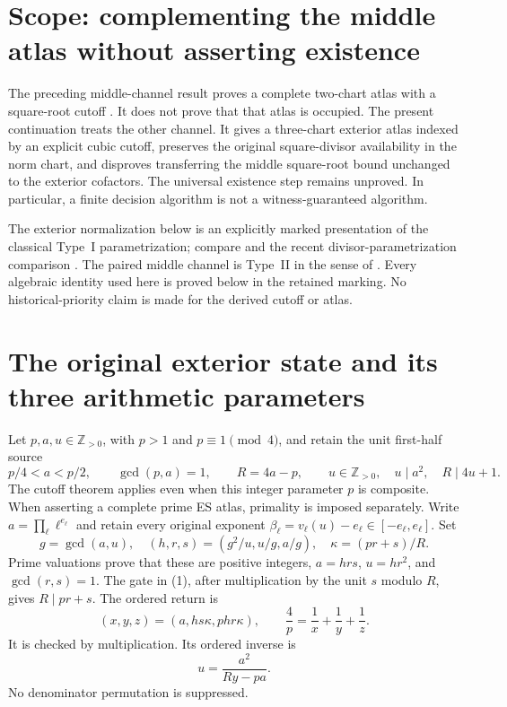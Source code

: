 \section{Scope: complementing the middle atlas without asserting existence}
The preceding middle-channel result proves a complete two-chart atlas with a
square-root cutoff \cite{Middle}. It does not prove that that atlas is occupied.
The present continuation treats the other channel. It gives a three-chart
exterior atlas indexed by an explicit cubic cutoff, preserves the original
square-divisor availability in the norm chart, and disproves transferring the
middle square-root bound unchanged to the exterior cofactors. The universal
existence step remains unproved. In particular, a finite decision algorithm is
not a witness-guaranteed algorithm.

The exterior normalization below is an explicitly marked presentation of the
classical Type~I parametrization; compare \cite[\S2, Proposition~2.2]{ET} and
the recent divisor-parametrization comparison \cite[\S3]{BHF}.  The paired
middle channel is Type~II in the sense of \cite[\S2,
Proposition~2.6]{ET}.  Every algebraic identity used here is proved below in
the retained marking.  No historical-priority claim is made for the derived
cutoff or atlas.

\section{The original exterior state and its three arithmetic parameters}
Let $p,a,u\in\mathbb Z_{>0}$, with $p>1$ and $p\equiv1\pmod4$, and retain
the unit first-half source
\[
 p/4<a<p/2,\qquad \gcd(p,a)=1,\qquad R=4a-p,
 \qquad u\in\mathbb Z_{>0},\quad u\mid a^2,\quad R\mid4u+1. \tag{1}
\]
The cutoff theorem applies even when this integer parameter $p$ is composite.
When asserting a complete prime ES atlas, primality is imposed separately.
Write $a=\prod_\ell\ell^{e_\ell}$ and retain every original exponent
$\beta_\ell=v_\ell(u)-e_\ell\in[-e_\ell,e_\ell]$.
Set
\[
 g=\gcd(a,u),\quad
 (h,r,s)=(g^2/u,u/g,a/g),\quad
 \kappa=(pr+s)/R.                                        \tag{2}
\]
Prime valuations prove that these are positive integers, $a=hrs$, $u=hr^2$,
and $\gcd(r,s)=1$. The gate in (1), after multiplication by the unit $s$ modulo
$R$, gives $R\mid pr+s$. The ordered return is
\[
 \boxed{(x,y,z)=(a,hs\kappa,phr\kappa),\qquad
 \frac4p=\frac1x+\frac1y+\frac1z.}                       \tag{3}
\]
It is checked by multiplication. Its ordered inverse is
\[
 u=\frac{a^2}{Ry-pa}.
\]
No denominator permutation is suppressed.

